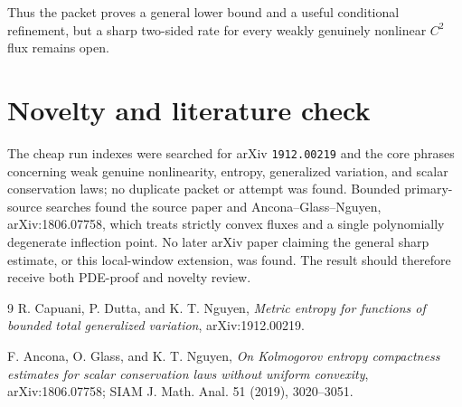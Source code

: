 \documentclass[11pt]{article}
\begin{document}
Thus the packet proves a general lower bound and a useful conditional
refinement, but a sharp two-sided rate for every weakly genuinely nonlinear
\(C^2\) flux remains open.

\section*{Novelty and literature check}

The cheap run indexes were searched for arXiv \texttt{1912.00219} and the
core phrases concerning weak genuine nonlinearity, entropy, generalized
variation, and scalar conservation laws; no duplicate packet or attempt was
found.  Bounded primary-source searches found the source paper and
Ancona--Glass--Nguyen, arXiv:1806.07758, which treats strictly convex fluxes
and a single polynomially degenerate inflection point.  No later arXiv paper
claiming the general sharp estimate, or this local-window extension, was
found.  The result should therefore receive both PDE-proof and novelty review.

\begin{thebibliography}{9}
R. Capuani, P. Dutta, and K. T. Nguyen,
\emph{Metric entropy for functions of bounded total generalized variation},
arXiv:1912.00219.

F. Ancona, O. Glass, and K. T. Nguyen,
\emph{On Kolmogorov entropy compactness estimates for scalar conservation
laws without uniform convexity}, arXiv:1806.07758; SIAM J. Math. Anal. 51
(2019), 3020--3051.
\end{thebibliography}
\end{document}
